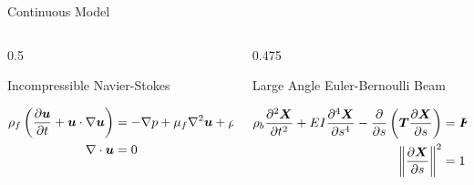 \documentclass[10pt,english]{beamer}
\begin{document}
\begin{frame}{Continuous Model}
    \small
    \begin{columns}[T,onlytextwidth]
        \begin{column}{0.5\textwidth}
            \begin{block}{Incompressible Navier-Stokes}
                \begin{minipage}[t][2.25cm][t]{\linewidth}
                    \begin{align*}
                        \rho_f \left(\pdv{\bm{u}}{t} + \bm{u} \cdot \nabla \bm{u}\right) & =
                        - \nabla p + \mu_f \nabla^2 \bm{u}
                        + \rho_f \bm{g} + \bm{f}                                         \\
                        \nabla \cdot \bm{u}                                              & = 0
                    \end{align*}
                \end{minipage}
            \end{block}
        \end{column}
        \begin{column}{0.475\textwidth}
            \begin{block}{Large Angle Euler-Bernoulli Beam}
                \begin{minipage}[t][2.25cm][t]{\linewidth}
                    \begin{align*}
                        \rho_b \pdv[2]{\bm{X}}{t}
                        + EI \pdv[4]{\bm{X}}{s}
                        - \pdv{}{s} \left(\bm{T} \pdv{\bm{X}}{s}\right) & =
                        \bm{F} + \rho_b\bm{g}                           \\
                        \left\lVert\pdv{\bm{X}}{s}\right\rVert^2                            & = 1
                    \end{align*}
                \end{minipage}

\end{block}
\end{column}
\end{columns}
\end{frame}
\end{document}
